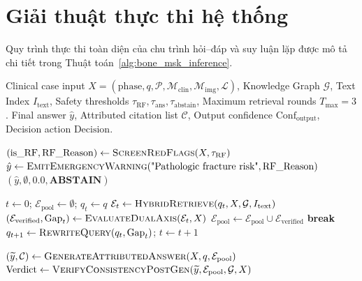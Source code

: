 \section{Giải thuật thực thi hệ thống}
Quy trình thực thi toàn diện của chu trình hỏi--đáp và suy luận lặp được mô tả chi tiết trong Thuật toán~\ref{alg:bone_msk_inference}.

\begin{algorithm}[h!]
\footnotesize
\caption{Multi-Stage Clinical Verification and Inference Workflow (Bone-MSK QA)}
\label{alg:bone_msk_inference}
\begin{algorithmic}[1]
\Require Clinical case input $X = (\mathrm{phase}, q, \mathcal{P}, \mathcal{M}_{\mathrm{clin}}, \mathcal{M}_{\mathrm{img}}, \mathcal{L})$, Knowledge Graph $\mathcal{G}$, Text Index $I_{\mathrm{text}}$, Safety thresholds $\tau_{\mathrm{RF}}, \tau_{\mathrm{ans}}, \tau_{\mathrm{abstain}}$, Maximum retrieval rounds $T_{\max} = 3$.
\Ensure Final answer $\hat{y}$, Attributed citation list $\mathcal{C}$, Output confidence $\mathrm{Conf}_{\mathrm{output}}$, Decision action $\mathrm{Decision}$.

\State $(\mathrm{is\_RF}, \mathrm{RF\_Reason}) \leftarrow \Call{ScreenRedFlags}{X, \tau_{\mathrm{RF}}}$
    \State $\hat{y} \leftarrow \Call{EmitEmergencyWarning}{\text{"Pathologic fracture risk"}, \mathrm{RF\_Reason}}$
    \State \Return $(\hat{y}, \emptyset, 0.0, \mathbf{ABSTAIN})$
\EndIf

\State $t \leftarrow 0$; \quad $\mathcal{E}_{\mathrm{pool}} \leftarrow \emptyset$; \quad $q_t \leftarrow q$
    \State $\mathcal{E}_t \leftarrow \Call{HybridRetrieve}{q_t, X, \mathcal{G}, I_{\mathrm{text}}}$
    \State $(\mathcal{E}_{\mathrm{verified}}, \mathrm{Gap}_t) \leftarrow \Call{EvaluateDualAxis}{\mathcal{E}_t, X}$
    \State $\mathcal{E}_{\mathrm{pool}} \leftarrow \mathcal{E}_{\mathrm{pool}} \cup \mathcal{E}_{\mathrm{verified}}$
     \textbf{break} \EndIf
    \State $q_{t+1} \leftarrow \Call{RewriteQuery}{q_t, \mathrm{Gap}_t}$; \quad $t \leftarrow t + 1$
\EndWhile

\State $(\widetilde{y}, \mathcal{C}) \leftarrow \Call{GenerateAttributedAnswer}{X, q, \mathcal{E}_{\mathrm{pool}}}$
\State $\mathrm{Verdict} \leftarrow \Call{VerifyConsistencyPostGen}{\widetilde{y}, \mathcal{E}_{\mathrm{pool}}, \mathcal{G}, X}$


\end{algorithmic}
\end{algorithm}
